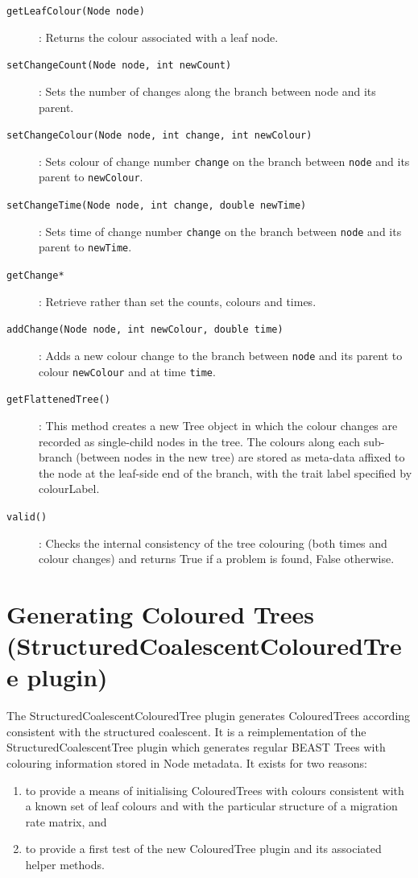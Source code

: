 \documentclass[a4paper,11pt]{paper}
\newcommand{\class}[1]{\textsf{#1}}
\newcommand{\inp}[1]{\textsf{\color{blue}#1}}
\newcommand{\code}[1]{\texttt{#1}}
\begin{document}
\begin{description}
	\item[\code{getLeafColour(Node node)}]: Returns the colour
		associated with a leaf node.

	\item[\code{setChangeCount(Node node, int newCount)}]: Sets the
			number of changes along the branch between node and its
			parent.

	\item[\code{setChangeColour(Node node, int change, int
		newColour)}]: Sets colour of change number \code{change} on the branch
		between \code{node} and its parent to \code{newColour}.
	

	\item[\code{setChangeTime(Node node, int change, double newTime)}]:
		Sets time of change number \code{change} on the
		branch between \code{node} and its parent to \code{newTime}.
	
	\item[\code{getChange*}]: Retrieve rather than set the counts,
		colours and times.

	\item[\code{addChange(Node node, int newColour, double time)}]:
		Adds a new colour change to the branch between \code{node} and
		its parent to colour \code{newColour} and at time \code{time}.

	\item[\code{getFlattenedTree()}]: This method creates a new
		\class{Tree} object in which the colour changes are recorded
		as single-child nodes in the tree. The colours along each
		sub-branch (between nodes in the new tree) are stored as
		meta-data affixed to the node at the leaf-side end of the
		branch, with the trait label specified by \inp{colourLabel}.

	\item[\code{valid()}]: Checks the internal consistency of the tree
		colouring (both times and colour changes) and returns True if
		a problem is found, False otherwise.

\end{description}


\section{Generating Coloured Trees (StructuredCoalescentColouredTree plugin)}

The \class{StructuredCoalescentColouredTree} plugin generates
\class{ColouredTree}s according consistent with the structured
coalescent.  It is a reimplementation of the
\class{StructuredCoalescentTree} plugin which generates regular BEAST
\class{Tree}s with colouring information stored in \class{Node}
metadata. It exists for two reasons:
\begin{enumerate}
	\item to provide a means of initialising \class{ColouredTree}s
		with colours consistent with a known set of leaf colours and with the
		particular structure of a migration rate matrix, and
	\item to provide a first test of the new \class{ColouredTree}
		plugin and its associated helper methods.
\end{enumerate}
\end{document}
